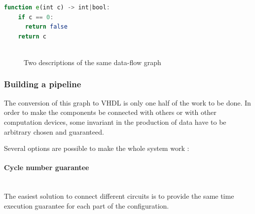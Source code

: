 \documentclass[10pt,a4paper]{article}
\begin{document}
\newbox\caseB
\begin{lrbox}{\caseB}
	\begin{minipage}[t]{.45\textwidth}
		\begin{lstlisting}[language=Octave, frame=single]
function e(int c) -> int|bool:
    if c == 0:
      return false
    return c
  
		\end{lstlisting}
	\end{minipage}
\end{lrbox}


\begin{figure}[h]
	\centering
	\hspace{.77cm}
	
	\caption{Two descriptions of the same data-flow graph}
\end{figure}


\subsubsection{Building a pipeline}

\label{Opts}

The conversion of this graph to VHDL is only one half of the work to be done. In order to make the components be connected with others or with other computation devices, some invariant in the production of data have to be arbitrary chosen and guaranteed.

Several options are possible to make the whole system work :

\paragraph{Cycle number guarantee}
~\\
The easiest solution to connect different circuits is to provide the same time execution guarantee for each part of the configuration. 
\end{document}
